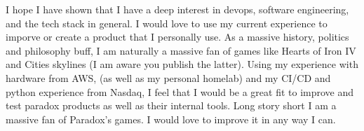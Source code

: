 \documentclass[../../main.tex]{subfiles}
\begin{document}
I hope I have shown that I have a deep interest in devops, software engineering, and the tech stack in general. I would love to use my current experience to imporve or create a product that I personally use. As a massive history, politics and philosophy buff, I am naturally a massive fan of games like Hearts of Iron IV and Cities skylines (I am aware you publish the latter). Using my experience with hardware from AWS, (as well as my personal homelab) and my CI/CD and python experience from Nasdaq, I feel that I would be a great fit to improve and test paradox products as well as their internal tools. Long story short I am a massive fan of Paradox's games. I would love to improve it in any way I can.
\\
\end{document}
